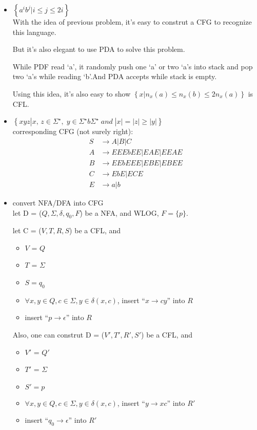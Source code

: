 \documentclass{article}
\begin{document}
\begin{itemize}
        \item $\left\{ a^ib^j | i \leq j \leq 2i \right\}$ \\ 
            With the idea of previous problem, it's easy to construt a CFG to recognize this language.

            But it's also elegant to use PDA to solve this problem. 
            
            While PDF read `a', it randomly push one `a' or two `a's into stack and pop two `a's while reading `b'.And PDA accepts while stack is empty.
            
            Using this idea, it's also easy to show $\left\{ x | n_{x}(a) \leq n_{x}(b) \leq 2n_{x}(a) \right\}$ is CFL.

        \item $\left\{xyz|x,\,z\in \Sigma^\star ,\; y\in \Sigma^\star b \Sigma^\star \; and \; |x|=|z|\geq |y|\right\}$ \\ corresponding CFG (not surely right):
            \begin{align*}
                S & \rightarrow A|B|C\\
                A & \rightarrow EEEbEE | EAE | EEAE \\ 
                B & \rightarrow EEbEEE | EBE | EBEE \\
                C & \rightarrow EbE | ECE\\
                E & \rightarrow a|b
            \end{align*}
        \item convert NFA/DFA into CFG \\
            let D = ($Q, \Sigma, \delta, q_{0}, F$) be a NFA, and WLOG, $F = \{p\}$.
            
            let C = ($V, T, R, S$) be a CFL, and
            \begin{itemize}
                \item $V$ = $Q$ 
                \item  $T$ = $\Sigma$ 
                \item $S = q_{0}$
                \item $\forall x, y \in Q, c \in \Sigma, y\in \delta(x, c)$, insert ``$x \rightarrow cy$'' into $R$ 
                \item insert ``$p \rightarrow \epsilon$'' into $R$
            \end{itemize}

            Also, one can construt D = ($V', T', R', S'$) be a CFL, and
            \begin{itemize}
                \item $V'$ = $Q'$ 
                \item  $T'$ = $\Sigma$ 
                \item $S' = p$
                \item $\forall x, y \in Q, c \in \Sigma, y\in \delta(x, c)$, insert ``$y \rightarrow xc$'' into $R'$ 
                \item insert ``$q_{0} \rightarrow \epsilon$'' into $R'$
            \end{itemize}


\end{itemize}
\end{document}
